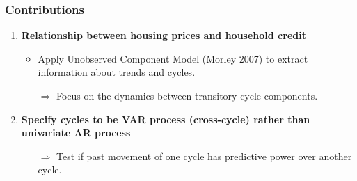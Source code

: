 \documentclass[10pt]{beamer}
\begin{document}
\begin{frame}
	\frametitle{Contributions}
	
	\begin{enumerate}
		\item \textbf{Relationship between housing prices and household credit}
		\begin{itemize}
			\item Apply Unobserved Component Model (Morley 2007) to extract information about trends and cycles.
			\medskip
			\item[$\Rightarrow$] Focus on the dynamics between transitory cycle components.
		\end{itemize} 
		
		\smallskip
		
		\item \textbf{Specify cycles to be VAR process (cross-cycle) rather than univariate AR process}
		\begin{itemize}
			\medskip
			\item[$\Rightarrow$] Test if past movement of one cycle has predictive power over another cycle.
		\end{itemize} 
%		
%		
%				
		
	\end{enumerate}	
	
\end{frame}
\end{document}

